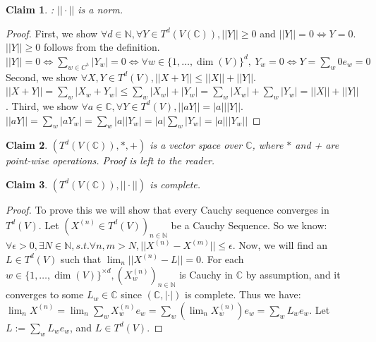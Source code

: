 \documentclass{article}
\newtheorem*{claim}{Claim}
\begin{document}
\begin{claim}: $||\cdot||$ is a norm.\end{claim}
\begin{proof} First,  we show $\forall d \in \mathbb{N}, \forall Y \in T^d(V(\mathbb{C})), ||Y|| \geq 0$ and $||Y|| =0 \iff Y=0$. $||Y|| \geq 0 $ follows from the definition. $||Y|| = 0 \iff \sum_{w \in C^5} |Y_w| = 0 \iff  \forall w\in \{1,\dots,\dim(V)\}^d, \: Y_w = 0 \iff Y = \sum_w 0 e_w = 0$Second, we show $ \forall X,Y \in T^d(V), ||X + Y|| \leq ||X|| + ||Y||$.$||X + Y|| = \sum_w |X_w + Y_w| \leq \sum_w |X_w| + |Y_w| = \sum_w |X_w| + \sum_w |Y_w| = ||X||+||Y||$.
Third, we show $\forall a \in \mathbb{C}, \forall Y \in T^d(V),||aY|| = |a|||Y||$.
$||aY|| = \sum_w |aY_w| = \sum_w |a||Y_w| = |a|\sum_w |Y_w| = |a| ||Y_w||$
\end{proof}
\begin{claim} $(T^d(V(\mathbb{C})), *, +)$ is a vector space over $\mathbb{C}$, where $*$ and + are point-wise operations. Proof is left to the reader. \end{claim}
\begin{claim} $(T^d(V(\mathbb{C})),||\cdot||)$ is complete.\end{claim}
\begin{proof} To prove this we will show that every Cauchy sequence converges in $T^d(V)$. Let $(X^{(n)} \in T^d(V))_{n\in \mathbb{N}}$ be a Cauchy Sequence. So we know: $\forall \epsilon > 0, \exists N \in \mathbb{N}, s.t. \forall n,m>N,  ||X^{(n)} - X^{(m)}|| \leq \epsilon $. Now, we will find an $ L\in T^d(V)$ such that $ \lim_n||X^{(n)} - L|| = 0$. For each $w \in \{1,\dots,\dim(V)\}^{\times d}, (X^{(n)}_w)_{n\in\mathbb{N}}$ is Cauchy in $ \mathbb{C}$ by assumption, and it converges to some $ L_w \in \mathbb{C}$ since $(\mathbb{C},|\cdot|)$ is complete. Thus we have: $\lim_n X^{(n)}= \lim_n \sum_w X^{(n)}_w e_w = \sum_w (\lim_n X^{(n)}_w)e_w = \sum_w L_w e_w $. Let $L:= \sum_w L_w e_w $, and $L \in T^d(V)$.
\end{proof}
\end{document}
